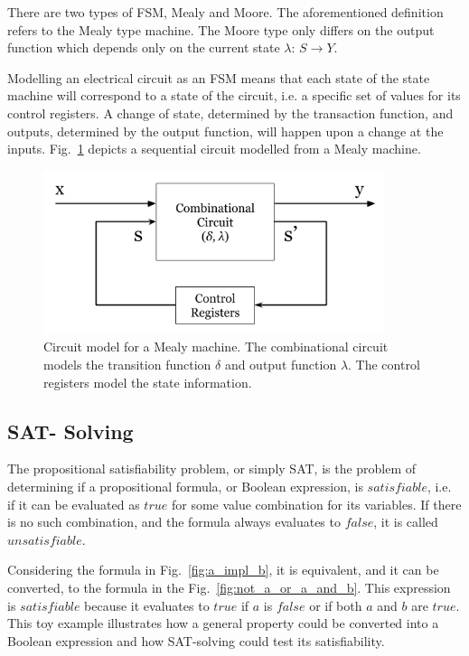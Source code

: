 There are two types of FSM, Mealy and Moore. The aforementioned definition refers to the Mealy type machine. The Moore type only differs on the output function which depends only on the current state $\lambda$: $S \to Y$.

Modelling an electrical circuit as an FSM means that each state of the state machine will correspond to a state of the circuit, i.e. a specific set of values for its control registers. A change of state, determined by the transaction function, and outputs, determined by the output function, will happen upon a change at the inputs. Fig.~\ref{fig:mealy_circuit} depicts a sequential circuit modelled from a Mealy machine.

\begin{figure}[htb!]
	\centering
	\includegraphics[width=10cm]{images/mealy_circuit.png}
	\caption{Circuit model for a Mealy machine. The combinational circuit models the transition function $\delta$ and output function $\lambda$. The control registers model the state information.}
	\label{fig:mealy_circuit}
\end{figure}

\subsection*{SAT- Solving}

The propositional satisfiability problem, or simply SAT, is the problem of determining if a propositional formula, or Boolean expression, is $satisfiable$, i.e. if it can be evaluated as $true$ for some value combination for its variables. If there is no such combination, and the formula always evaluates to $false$, it is called $unsatisfiable$. 

Considering the formula in Fig.~\ref{fig:a_impl_b}, it is equivalent, and it can be converted, to the formula in the Fig.~\ref{fig:not_a_or_a_and_b}. This expression is $satisfiable$ because it evaluates to $true$ if $a$ is $false$ or if both $a$ and $b$ are $true$. This toy example illustrates how a general property could be converted into a Boolean expression and how SAT-solving could test its satisfiability.

